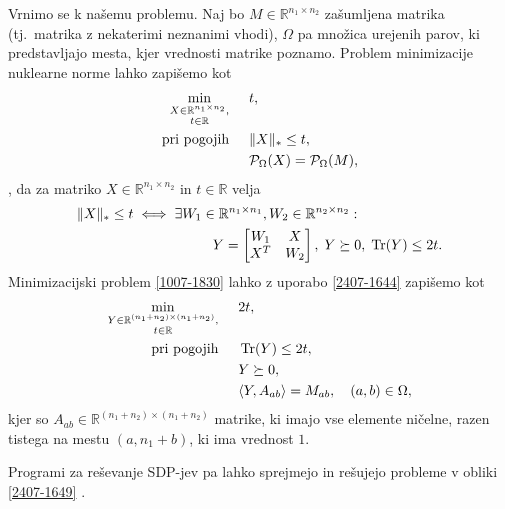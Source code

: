 Vrnimo se k našemu problemu. Naj bo $M \in \mathbb{R}^{n_1 \times n_2}$ zašumljena matrika (tj.\ matrika z nekaterimi neznanimi vhodi), $\Omega$ pa množica urejenih parov, ki predstavljajo mesta, kjer vrednosti matrike poznamo.
Problem minimizacije nuklearne norme lahko zapišemo kot
\begin{align}
\label{1007-1830}
\begin{split}
    \min_{\substack{X\in \mathbb R^{n_1\times n_2},\\ t\in \mathbb R}} \hspace{0.5cm}        & t,                                               \\
    \text{pri pogojih} \hspace{0.5cm} & \lVert X\rVert_* \leq t,  \\
                                      & \mathcal{P}_\Omega(X) = \mathcal{P}_\Omega(M),
\end{split}
\end{align}
 \cite{NNM-PHD}, da za matriko $X \in \mathbb{R}^{n_1 \times n_2}$ in $t \in \mathbb{R}$
velja 
\begin{align}
\label{2407-1644}
\begin{split}
\lVert X\rVert_* \leq t &\iff \exists W_1\in \mathbb{R}^{n_1 \times n_1}, W_2 \in \mathbb{R}^{n_2 \times n_2}:\\
&\hspace{2cm}
Y = \begin{bmatrix}
               W_1 & X                     \\
               X^T & W_2 
           \end{bmatrix},\;       Y \succeq 0,\; \operatorname{Tr}(Y) \leq 2t.
\end{split}
\end{align}
Minimizacijski problem \eqref{1007-1830} lahko z uporabo \eqref{2407-1644} zapišemo kot
\begin{align}
\label{2407-1649}
\begin{split}
    \min_{\substack{Y\in \mathbb R^{(n_1+n_2)\times (n_1+n_2)},\\ t\in \mathbb R}}     \hspace{0.5cm} & 2t,                        \\
    \text{pri pogojih} \hspace{0.5cm} & \operatorname{Tr}(Y) \leq 2t,           \\
                                  & Y \succeq 0,              \\
                                  & \langle Y, A_{ab} \rangle = M_{ab},\quad (a,b)\in \Omega,
\end{split}
\end{align}
kjer so $A_{ab} \in \mathbb{R}^{(n_1 + n_2) \times (n_1 + n_2)}$ matrike, ki imajo vse elemente ničelne, razen tistega na mestu $(a, n_1 + b)$, ki ima vrednost $1$.
\iffalse
Ker velja
\[
    \trOp{A}{B} = \sum_{i}^{n_1} \sum_{j}^{n_2} a_{ij}b_{ij}
\] je lahko videti, da je tak pogoj smiselen. 
\fi
Programi za reševanje SDP-jev pa lahko sprejmejo in rešujejo probleme v obliki \eqref{2407-1649}
\cite{Survey-NKS19}.


